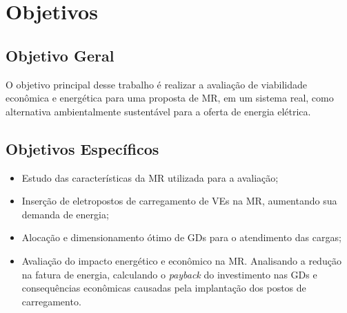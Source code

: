 \documentclass[]{IEEEphot}
\begin{document}

\section{Objetivos}
\subsection{Objetivo Geral}
O objetivo principal desse trabalho é realizar a avaliação de viabilidade econômica e energética para uma proposta de MR, em um sistema real, como alternativa ambientalmente sustentável para a oferta de energia elétrica.
\subsection{Objetivos Específicos}
	\begin{itemize}
	\item Estudo das características da MR utilizada para a avaliação;
	\item Inserção de eletropostos de carregamento de VEs na MR, aumentando sua demanda de energia;
	\item Alocação e dimensionamento ótimo de GDs para o atendimento das cargas;
	\item Avaliação do impacto energético e econômico na MR. Analisando a redução na fatura de energia, calculando o \textit{payback} do investimento nas GDs e consequências econômicas causadas pela implantação dos postos de carregamento.
\end{itemize}
\end{document}
